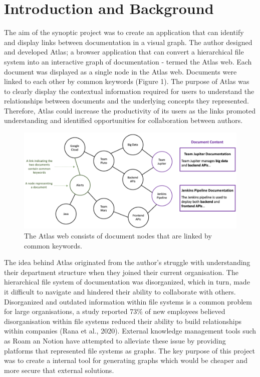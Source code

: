 \documentclass{article}
\begin{document}
\newpage

\tableofcontents

\newpage

\section{Introduction and Background}

The aim of the synoptic project was to create an application that can identify and display links between documentation in a visual graph. The author designed and developed Atlas; a browser application that can convert a hierarchical file system into an interactive graph of documentation - termed the Atlas web. Each document was displayed as a single node in the Atlas web. Documents were linked to each other by common keywords (Figure 1). The purpose of Atlas was to clearly display the contextual information required for users to understand the relationships between documents and the underlying concepts they represented. Therefore, Atlas could increase the productivity of its users as the links promoted understanding and identified opportunities for collaboration between authors. 

\begin{figure}[!htb]
  \centering
      \includegraphics[width=1\textwidth]{images/web-intro.png}
  \caption{The Atlas web consists of document nodes that are linked by common keywords.}
\end{figure}


The idea behind Atlas originated from the author's struggle with understanding their department structure when they joined their current organisation. The hierarchical file system of documentation was disorganized, which in turn, made it difficult to navigate and hindered their ability to collaborate with others. Disorganized and outdated information within file systems is a common problem for large organisations, a study reported 73\% of new employees believed disorganisation within file systems reduced their ability to build relationships within companies (Rana et al., 2020). External knowledge management tools such as Roam an Notion have attempted to alleviate these issue by providing platforms that represented file systems as graphs. The key purpose of this project was to create a internal tool for generating graphs which would be cheaper and more secure that external solutions.
\end{document}
